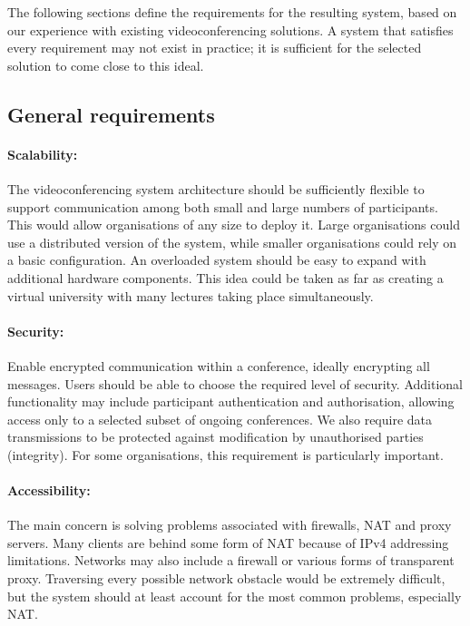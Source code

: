 The following sections define the requirements for the resulting system, based on our experience with existing videoconferencing solutions. A system that satisfies every requirement may not exist in practice; it is sufficient for the selected solution to come close to this ideal.

\subsection{General requirements}

\paragraph*{Scalability:}
The videoconferencing system architecture should be sufficiently flexible to support communication among both small and large numbers of participants. This would allow organisations of any size to deploy it. Large organisations could use a distributed version of the system, while smaller organisations could rely on a basic configuration. An overloaded system should be easy to expand with additional hardware components. This idea could be taken as far as creating a virtual university with many lectures taking place simultaneously.

\paragraph*{Security:}
Enable encrypted communication within a conference, ideally encrypting all messages. Users should be able to choose the required level of security. Additional functionality may include participant authentication and authorisation, allowing access only to a selected subset of ongoing conferences. We also require data transmissions to be protected against modification by unauthorised parties (integrity). For some organisations, this requirement is particularly important.

\paragraph*{Accessibility:}
The main concern is solving problems associated with firewalls, NAT and proxy servers. Many clients are behind some form of NAT because of IPv4 addressing limitations. Networks may also include a firewall or various forms of transparent proxy. Traversing every possible network obstacle would be extremely difficult, but the system should at least account for the most common problems, especially NAT.

